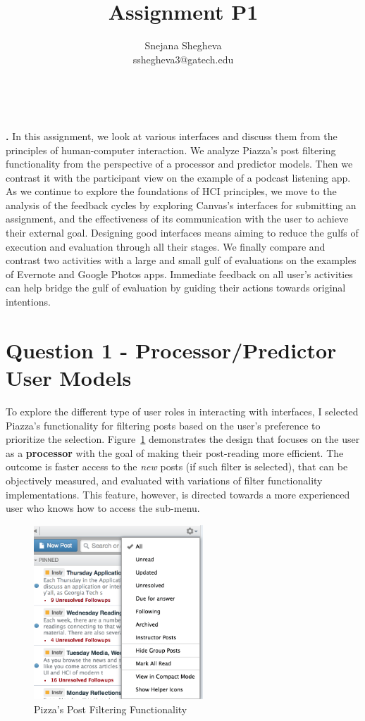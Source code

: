 \documentclass[12pt,letterpaper]{article}
\makeatletter
\renewcommand{\maketitle}{\bgroup
   \begin{center}
   \textbf{{\fontsize{18pt}{20}\selectfont \@title}}\\
   \vspace{10pt}
   {\fontsize{12pt}{0}\selectfont \@author} 
   \end{center}
}
\newenvironment{myquote}[1]%
  {\list{}{\leftmargin=#1\rightmargin=#1}\item[]}%
  {\endlist}
\renewenvironment{abstract}
{\vspace*{-.5in}\fontsize{12pt}{12}\begin{myquote}{.5in}
\noindent \par{\bfseries \abstractname.}}
{\medskip\noindent
\end{myquote}
}
\makeatother
\begin{document}
\title{Assignment P1}
\author{Snejana Shegheva \\ sshegheva3@gatech.edu}

\maketitle
\thispagestyle{fancy}

\begin{abstract}
In this assignment, we look at various interfaces and discuss them from the principles of human-computer interaction. We analyze Piazza's post filtering functionality from the perspective of a processor and predictor models. Then we contrast it with the participant view on the example of a podcast listening app. As we continue to explore the foundations of HCI principles, we move to the analysis of the feedback cycles by exploring Canvas's interfaces for submitting an assignment, and the effectiveness of its communication with the user to achieve their external goal. Designing good interfaces means aiming to reduce the gulfs of execution and evaluation through all their stages. We finally compare and contrast two activities with a large and small gulf of evaluations on the examples of Evernote and Google Photos apps. Immediate feedback on all user's activities can help bridge the gulf of evaluation by guiding their actions towards original intentions.  
\end{abstract}

\section*{Question 1 - Processor/Predictor User Models}
To explore the different type of user roles in interacting with interfaces, I selected Piazza's functionality for filtering posts based on the user's preference to prioritize the selection. Figure~\ref{fig::1} demonstrates the design that focuses on the user as a \textbf{processor} with the goal of making their post-reading more efficient. The outcome is faster access to the \textit{new} posts (if such filter is selected), that can be objectively measured, and evaluated with variations of filter functionality implementations. This feature, however, is directed towards a more experienced user who knows how to access the sub-menu. 

\begin{figure}[H]
\centering
\includegraphics[width=2.5in, scale=.25]{piazza_filter.png}
\caption{Pizza's Post Filtering Functionality}
\label{fig::1}
\end{figure}
\end{document}
